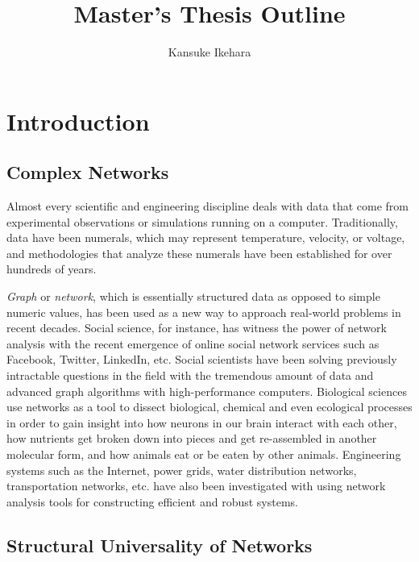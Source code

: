 \documentclass{article}
\begin{document}
\title{Master's Thesis Outline}
\author{Kansuke Ikehara}
\maketitle

\begin{abstract}

\end{abstract}
\tableofcontents


\section{Introduction}
	\subsection{Complex Networks}
	Almost every scientific and engineering discipline deals with data that come from experimental observations or simulations running on a computer. Traditionally, data have been numerals, which may represent temperature, velocity, or voltage, and methodologies that analyze these numerals have been established for over hundreds of years. 
	
	\textit{Graph} or \textit{network}, which is essentially structured data as opposed to simple numeric values, has been used as a new way to approach real-world problems in  recent decades. Social science, for instance, has witness the power of network analysis with the recent emergence of online social network services such as Facebook, Twitter, LinkedIn, etc.  Social scientists have been solving previously intractable questions in the field with the tremendous amount of  data and advanced graph algorithms with high-performance computers. Biological sciences use networks as a tool to dissect biological, chemical and even ecological processes in order to gain insight into how neurons in our brain interact with each other, how nutrients get broken down into pieces and get re-assembled in another molecular form, and how animals eat or be eaten by other animals. Engineering systems such as the Internet, power grids, water distribution networks, transportation networks, etc. have also been investigated with using network analysis tools for constructing efficient and robust systems. 
	
	
	\subsection{Structural Universality of Networks}
	
\end{document}
